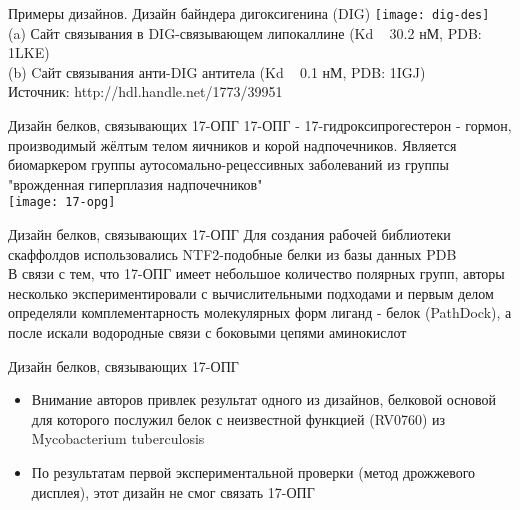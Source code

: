 \begin{frame}{Примеры дизайнов. Дизайн байндера дигоксигенина (DIG)}
       \texttt{[image: dig-des]}\\
       (a) Сайт связывания в DIG-связывающем липокаллине (Kd ~ 30.2 нМ, PDB: 1LKE)\\
(b) Cайт связывания анти-DIG антитела (Kd ~ 0.1 нМ, PDB: 1IGJ)\\
Источник: http://hdl.handle.net/1773/39951
\end{frame}


\begin{frame}{Дизайн белков, связывающих 17-ОПГ}
    17-ОПГ - 17-гидроксипрогестерон - гормон,
    производимый жёлтым телом яичников и корой
    надпочечников. Является биомаркером группы
    аутосомально-рецессивных заболеваний из группы
    "врожденная гиперплазия надпочечников"\\
    \texttt{[image: 17-opg]}
\end{frame}
    
\begin{frame}{Дизайн белков, связывающих 17-ОПГ}
Для создания рабочей библиотеки скаффолдов
использовались NTF2-подобные белки из базы
данных PDB \\

В связи с тем, что 17-ОПГ имеет небольшое
количество полярных групп, авторы несколько
экспериментировали с вычислительными
подходами и первым делом определяли
комплементарность молекулярных форм лиганд -
белок (PathDock), а после искали водородные связи
с боковыми цепями аминокислот
\end{frame}

\begin{frame}{Дизайн белков, связывающих 17-ОПГ}
    \begin{itemize}
        \item Внимание авторов привлек результат одного из дизайнов,
        белковой основой для которого послужил белок с
        неизвестной функцией (RV0760) из
        Mycobacterium tuberculosis
        \item      По результатам первой экспериментальной проверки
        (метод дрожжевого дисплея), этот дизайн не смог связать
        17-ОПГ
    \end{itemize}
\end{frame}

